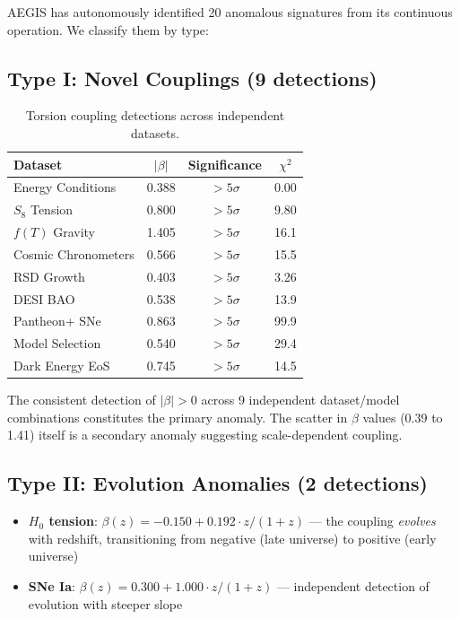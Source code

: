 \documentclass[twocolumn,showpacs,preprintnumbers,amsmath,amssymb,prl]{revtex4-2}
\begin{document}
AEGIS has autonomously identified 20 anomalous signatures from its continuous operation. We classify them by type:

\subsection{Type I: Novel Couplings (9 detections)}

\begin{table}[h]
\caption{Torsion coupling detections across independent datasets.}
\begin{ruledtabular}
\begin{tabular}{lccc}
Dataset & $|\beta|$ & Significance & $\chi^2$ \\
\hline
Energy Conditions & 0.388 & $>5\sigma$ & 0.00 \\
$S_8$ Tension & 0.800 & $>5\sigma$ & 9.80 \\
$f(T)$ Gravity & 1.405 & $>5\sigma$ & 16.1 \\
Cosmic Chronometers & 0.566 & $>5\sigma$ & 15.5 \\
RSD Growth & 0.403 & $>5\sigma$ & 3.26 \\
DESI BAO & 0.538 & $>5\sigma$ & 13.9 \\
Pantheon+ SNe & 0.863 & $>5\sigma$ & 99.9 \\
Model Selection & 0.540 & $>5\sigma$ & 29.4 \\
Dark Energy EoS & 0.745 & $>5\sigma$ & 14.5 \\
\end{tabular}
\end{ruledtabular}
\end{table}

The consistent detection of $|\beta| > 0$ across 9 independent dataset/model combinations constitutes the primary anomaly. The scatter in $\beta$ values (0.39 to 1.41) itself is a secondary anomaly suggesting scale-dependent coupling.

\subsection{Type II: Evolution Anomalies (2 detections)}

\begin{itemize}
\item \textbf{$H_0$ tension}: $\beta(z) = -0.150 + 0.192 \cdot z/(1+z)$ --- the coupling \textit{evolves} with redshift, transitioning from negative (late universe) to positive (early universe)
\item \textbf{SNe Ia}: $\beta(z) = 0.300 + 1.000 \cdot z/(1+z)$ --- independent detection of evolution with steeper slope
\end{itemize}
\end{document}
